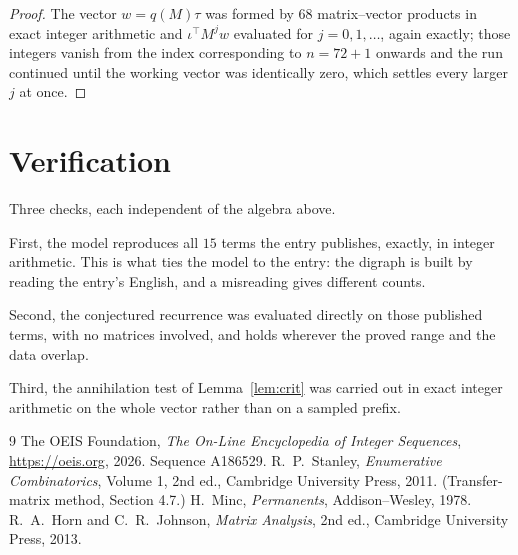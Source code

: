 \documentclass[11pt,a4paper]{article}
\theoremstyle{plain}
\theoremstyle{definition}
\begin{document}
\begin{proof}
The vector $w=q(M)\tau$ was formed by $68$ matrix--vector products in exact integer
arithmetic and $\iota^{\!\top}M^{j}w$ evaluated for $j=0,1,\dots$, again exactly; those
integers vanish from the index corresponding to $n=72+1$ onwards and the run continued
until the working vector was identically zero, which settles every larger $j$ at once.
\end{proof}

\section{Verification}

Three checks, each independent of the algebra above.

First, the model reproduces all $15$ terms the entry publishes, exactly, in integer
arithmetic. This is what ties the model to the entry: the digraph is built by reading the
entry's English, and a misreading gives different counts.

Second, the conjectured recurrence was evaluated directly on those published terms, with no
matrices involved, and holds wherever the proved range and the data overlap.

Third, the annihilation test of Lemma~\ref{lem:crit} was carried out in exact integer
arithmetic on the whole vector rather than on a sampled prefix.

\begin{thebibliography}{9}
 The OEIS Foundation, \emph{The On-Line Encyclopedia of Integer
Sequences}, \url{https://oeis.org}, 2026. Sequence A186529.
 R.~P.~Stanley, \emph{Enumerative Combinatorics}, Volume 1, 2nd ed.,
Cambridge University Press, 2011. (Transfer-matrix method, Section 4.7.)
 H.~Minc, \emph{Permanents}, Addison--Wesley, 1978.
 R.~A.~Horn and C.~R.~Johnson, \emph{Matrix Analysis}, 2nd ed., Cambridge
University Press, 2013.
\end{thebibliography}
\end{document}
